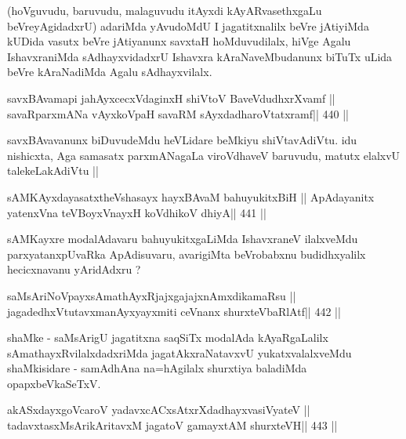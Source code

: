 \begin{artha}
(hoVguvudu, baruvudu, malaguvudu itAyxdi kAyARvasethxgaLu
  beVreyAgidadxrU) adariMda yAvudoMdU I jagatitxnalilx beVre jAtiyiMda
  kUDida vasutx beVre jAtiyanunx savxtaH hoMduvudilalx, hiVge Agalu
  IshavxraniMda sAdhayxvidadxrU Ishavxra kAraNaveMbudanunx biTuTx
  uLida beVre kAraNadiMda Agalu sAdhayxvilalx.
\end{artha}


\begin{shl}
savxBAvamapi ja{hAyx}cecxVdaginxH shiVtoV BaveVdudhxrXvamf ||
savaRparxmANa vAyxkoVpaH savaRM sAyxdadharoVtatxramf\hfill || 440 ||
\end{shl}

\begin{artha}
savxBAvavanunx biDuvudeMdu heVLidare beMkiyu
shiVtavAdiVtu. idu nishicxta, Aga samasatx parxmANagaLa viroVdhaveV
baruvudu, matutx elalxvU talekeLakAdiVtu ||
\end{artha}


\begin{shl}
sAMKAyxdayasatxtheVshasayx hayxBAvaM bahuyukitxBiH ||
ApAdayanitx yatenxVna teVBoyxV\s nayxH koV\s dhikoV dhiyA\hfill || 441 ||
\end{shl}

\begin{artha}
sAMKayxre modalAdavaru bahuyukitxgaLiMda IshavxraneV ilalxveMdu
parxyatanxpUvaRka ApAdisuvaru, avarigiMta beVrobabxnu budidhxyalilx
hecicxnavanu yAridAdxru ?
\end{artha}


\begin{shl}
saMsAriNoV\s payxsAmathAyxRjajxgajajxnAmxdikamaRsu ||
jagadedhxVtutavxmanAyxyayxmiti ceVnanx shurxteVbaRlAtf\hfill || 442 ||
\end{shl}

\begin{artha}
shaMke - saMsArigU jagatitxna saqSiTx modalAda kAyaRgaLalilx
sAmathayxRvilalxdadxriMda jagatAkxraNatavxvU yukatxvalalxveMdu
shaMkisidare - samAdhAna na=hAgilalx shurxtiya baladiMda 
opapxbeVkaSeTxV.
\end{artha}

\begin{shl}
akASxdayxgoVcaroV yadavxcACxsAtxrXdadhayxvasiVyateV ||
tadavxtasxMsArikAritavxM jagatoV gamayxtAM shurxteVH\hfill || 443 ||
\end{shl}

